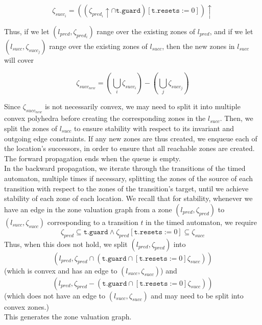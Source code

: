 \begin{displaymath} 
  \zeta _{succ_{i}} = ((\zeta _{pred_{i}} \uparrow \cap \texttt{t.guard})[\texttt{t.resets} := 0]) \uparrow
\end{displaymath} 

Thus, if we let  $(l_{pred}, \zeta _{pred_{i}})$ range over the
existing zones of $l_{pred}$, and if we let  $(l_{succ}, \zeta
_{succ_{j}})$ range over the existing zones of $l_{succ}$, then the
new zones in $l_{succ}$ will cover

\begin{displaymath} 
  \zeta _{succ_{new}} = (\bigcup _{i} \zeta_{succ_{i}}) - (\bigcup _{j} \zeta_{succ_{j}})
\end{displaymath} 

Since $\zeta _{succ_{new}}$ is not necessarily convex, we may need to
split it into multiple convex polyhedra before creating the
corresponding zones in the $l_{succ}$. Then, we split the zones of
$l_{succ}$ to ensure stability with respect to
its invariant and outgoing edge constraints. If any new
zones are thus created, we enqueue each of the location's successors,
in order to ensure that all reachable zones are created. The forward
propagation ends when the queue is empty. \\

In the backward propagation, we
iterate through the transitions of the timed automaton, multiple times
if necessary, splitting the zones of the source of each transition
with respect to the zones of the transition's target, until we achieve
stability of each zone of each location. We recall that for stability,
whenever we have an edge in the zone valuation graph from a zone
$(l_{pred}, \zeta _{pred})$ to $(l_{succ}, \zeta _{succ})$
corresponding to a transition $t$ in the timed automaton, we require 
\begin{displaymath} 
  \zeta _{pred} \subseteq \texttt{t.guard}
  \wedge
  \zeta _{pred} [\texttt{t.resets} := 0] \subseteq \zeta _{succ}
\end{displaymath} 
Thus, when this does not hold, we split $(l_{pred}, \zeta _{pred})$
into
\begin{displaymath} 
  (l_{pred}, \zeta _{pred} \cap (\texttt{t.guard} \cap [\texttt{t.resets} := 0] \zeta _{succ}))
\end{displaymath} 
(which is convex and has an edge to $(l_{succ}, \zeta _{succ})$)
and
\begin{displaymath} 
  (l_{pred}, \zeta _{pred} - (\texttt{t.guard} \cap [\texttt{t.resets} := 0] \zeta _{succ}))
\end{displaymath} 
(which does not have an edge to $(l_{succ}, \zeta _{succ})$ and may
need to be split into convex zones.) \\
This generates the zone valuation graph.

